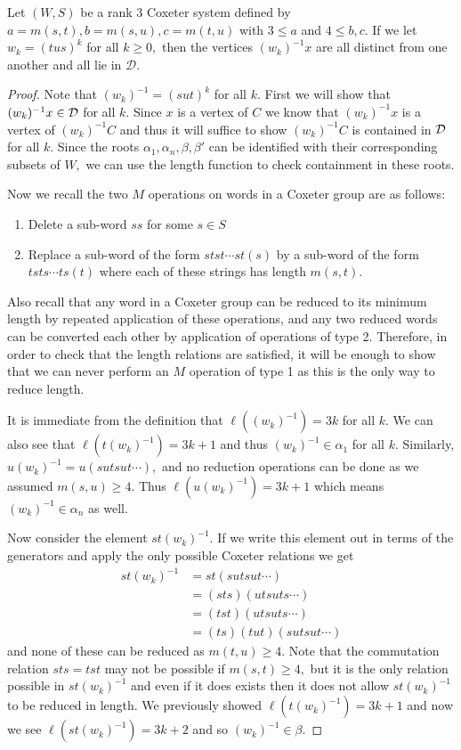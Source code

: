 \documentclass[class=book, crop=false,12 pt]{standalone}
\begin{document}
\begin{lemma}
	\label{lem:infmany}
	Let $(W,S)$ be a rank 3 Coxeter system defined by $a=m(s,t),b=m(s,u),c=m(t,u)$ with $3\le a$ and $4\le b,c.$ If we let $w_k=(tus)^k$ for all $k\ge 0,$ then the vertices $(w_k)^{-1}x$ are all distinct from one another and all lie in $\mathcal{D}.$
\end{lemma}
\begin{proof}
	Note that $(w_k)^{-1}=(sut)^k$ for all $k.$ First we will show that $(w_k)^{-1}x\in \mathcal{D}$ for all $k.$ Since $x$ is a vertex of $C$ we know that $(w_k)^{-1}x$ is a vertex of $(w_k)^{-1}C$ and thus it will suffice to show $(w_k)^{-1}C$ is contained in $\mathcal{D}$ for all $k.$ Since the roots $\alpha_1,\alpha_n,\beta,\beta'$ can be identified with their corresponding subsets of $W,$ we can use the length function to check containment in these roots.

Now we recall the two $M$ operations on words in a Coxeter group are as follows:
\begin{enumerate}
	\item Delete a sub-word $ss$ for some $s\in S$
	\item Replace a sub-word of the form $stst\cdots st(s)$ by a sub-word of the form $tsts\cdots ts(t)$ where each of these strings has length $m(s,t).$
\end{enumerate}
Also recall that any word in a Coxeter group can be reduced to its minimum length by repeated application of these operations, and any two reduced words can be converted each other by application of operations of type 2. Therefore, in order to check that the length relations are satisfied, it will be enough to show that we can never perform an $M$ operation of type 1 as this is the only way to reduce length.

It is immediate from the definition that $\ell((w_k)^{-1})=3k$ for all $k.$ We can also see that $\ell(t(w_k)^{-1})=3k+1$ and thus $(w_k)^{-1}\in \alpha_1$ for all $k.$ Similarly, $u(w_k)^{-1}=u(sutsut\cdots),$ and no reduction operations can be done as we assumed $m(s,u)\ge 4.$ Thus $\ell(u(w_k)^{-1})=3k+1$ which means $(w_k)^{-1}\in \alpha_n$ as well.

	Now consider the element $st(w_k)^{-1}.$ If we write this element out in terms of the generators and apply the only possible Coxeter relations we get
	\begin{align*}
		st(w_k)^{-1}&=st(sutsut\cdots)\\
		     &=(sts)(utsuts\cdots)\\
		     &=(tst)(utsuts\cdots)\\
		     &=(ts)(tut)(sutsut\cdots)
	\end{align*}
	and none of these can be reduced as $m(t,u)\ge 4.$ Note that the commutation relation $sts=tst$ may not be possible if $m(s,t)\ge 4,$ but it is the only relation possible in $st(w_k)^{-1}$ and even if it does exists then it does not allow $st(w_k)^{-1}$ to be reduced in length. We previously showed $\ell(t(w_k)^{-1})=3k+1$ and now we see $\ell(st(w_k)^{-1})=3k+2$ and so $(w_k)^{-1}\in \beta.$


\end{proof}
\end{document}
